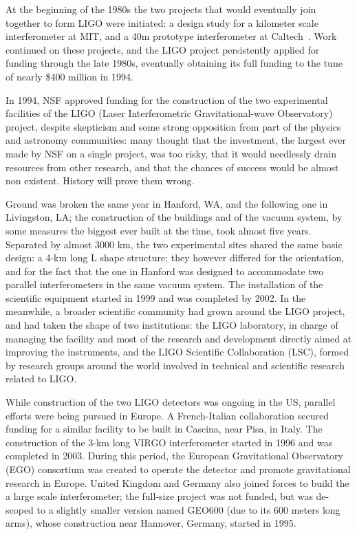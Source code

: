 At the beginning of the 1980s the two projects that would eventually join together to form LIGO were initiated: 
a design study for a kilometer scale interferometer at MIT, and a 40m 
prototype interferometer at Caltech~\cite{caltech40m}. Work continued on these projects, and the LIGO project persistently applied 
for funding through the late 1980s, eventually obtaining its full funding to the tune of nearly \$400 million in 1994. 



In 1994, NSF approved funding for the construction of the two experimental facilities 
of the LIGO (Laser Interferometric Gravitational-wave Observatory) project, despite 
skepticism and some strong opposition from part of the physics and astronomy 
communities: many thought that the investment, the largest ever made by NSF on a 
single project, was too risky, that it would needlessly drain resources from other 
research, and that the chances of success would be almost non existent. History will prove them wrong.

Ground was broken the same year in Hanford, WA, and the following one in Livingston, LA; 
the construction of the buildings and of the vacuum system, by some measures the biggest 
ever built at the time, took almost five years. Separated by almost 3000 km, the two 
experimental sites shared the same basic design: a 4-km long L shape structure; they 
however differed for the orientation, and for the fact that the one in Hanford was 
designed to accommodate two parallel interferometers in the same vacuum system. 
The installation of the scientific equipment started in 1999 and was completed by 2002. 
In the meanwhile, a broader scientific community had grown around the LIGO project, 
and had taken the shape of two institutions: the LIGO laboratory, in charge of managing 
the facility and most of the research and development directly aimed at improving the 
instruments, and the LIGO Scientific Collaboration (LSC), formed by research groups 
around the world involved in technical and scientific research related to LIGO.

While construction of the two LIGO detectors was ongoing in the US, parallel efforts 
were being pursued in Europe. A French-Italian collaboration secured funding for a 
similar facility to be built in Cascina, near Pisa, in Italy. The construction of the 3-km 
long VIRGO interferometer started in 1996 and was completed in 2003. During this period, 
the European Gravitational Observatory (EGO) consortium was created to operate the detector 
and promote gravitational research in Europe. United Kingdom and Germany also joined 
forces to build the a large scale interferometer; the full-size project was not funded, but 
was de-scoped to a slightly smaller version named GEO600 (due to its 600 meters long arms), 
whose construction near Hannover, Germany, started in 1995.

